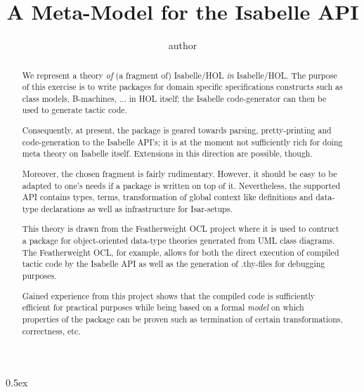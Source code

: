 \documentclass[fontsize=11pt,paper=a4,open=right,twoside,abstract=true]{scrreprt}
\begin{document}
\title{A Meta-Model for the Isabelle API}
\author{%
author
}

\maketitle

\begin{abstract}
We represent a theory \emph{of} (a fragment of) Isabelle/HOL 
\emph{in} Isabelle/HOL. The purpose of this exercise is to write packages for
domain specific specifications constructs such as class models, B-machines, ...
in HOL itself; the Isabelle code-generator can then be used to generate
tactic code.

Consequently, at present, the package is geared towards 
parsing, pretty-printing and code-generation to the Isabelle API's; 
it is at the moment not sufficiently rich for doing meta theory on 
Isabelle itself. Extensions in this direction are possible, though.

Moreover, the chosen fragment is fairly rudimentary. However, it should be easy
to be adapted to one's needs if a package is written on top of it.
Nevertheless, the supported API contains types, terms, transformation of
global context like definitions and data-type declarations as well
as infrastructure for Isar-setups.

This theory is drawn from the Featherweight OCL\cite{AFP} project where 
it is used to contruct a package for object-oriented data-type theories
generated from UML class diagrams. The Featherweight OCL, for example, allows for 
both the direct execution of compiled tactic code by the Isabelle API
as well as the generation of .thy-files for debugging purposes.

Gained experience from this project shows that the compiled code is sufficiently
efficient for practical purposes while being based on a formal \emph{model}
on which properties of the package can be proven such as termination of certain
transformations, correctness, etc.
\end{abstract}
\tableofcontents

\parindent 0pt\parskip 0.5ex



\cite{nipkow.ea:isabelle:2002}



\end{document}

